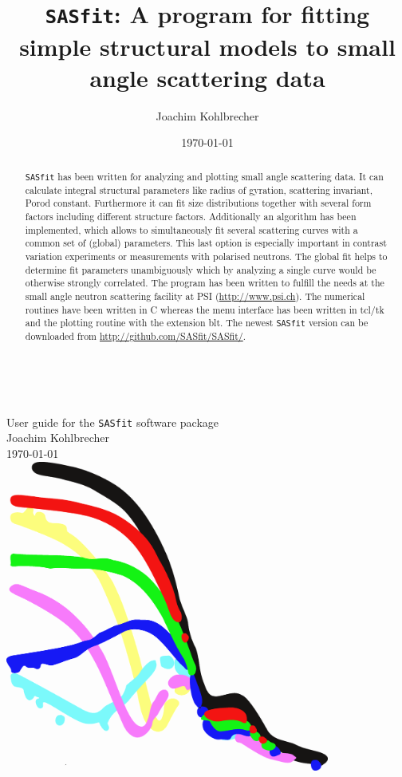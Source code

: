 \documentclass[12pt,intlimits,fleqn,reqno,twoside,english,a4paper]{amsbook}
\author[J. Kohlbrecher]{Joachim Kohlbrecher}
\numberwithin{equation}{chapter}
\numberwithin{figure}{chapter}
\numberwithin{section}{chapter}
\begin{document}
\sloppy

\setcounter{page}{0}
\thispagestyle{empty}
~\\
\begin{center}
{\Large User guide for the {\tt SASfit} software package} \\[1cm]

{\Large Joachim Kohlbrecher} ~\\[1.5cm]


\today
~\\[3.5cm]
\includegraphics[width=0.8\textwidth]{../images/SASfitIcon.png}
\end{center}


\title[SASfit]{{\tt SASfit}: A program for fitting simple
 structural models to small angle scattering data}

\date{\today}

\begin{abstract}
{\tt SASfit} has been written for analyzing and plotting small angle
scattering data. It can calculate integral structural parameters
like radius of gyration, scattering invariant, Porod constant.
Furthermore it can fit size distributions together with several form
factors including different structure factors. Additionally an
algorithm has been implemented, which allows to simultaneously fit
several scattering curves with a common set of (global) parameters.
This last option is especially important in contrast variation
experiments or measurements with polarised neutrons. The global fit
helps to determine fit parameters unambiguously which by analyzing a
single curve would be otherwise strongly correlated. The program has
been written to fulfill the needs at the small angle neutron
scattering facility at PSI (\url{http://www.psi.ch}). The
numerical routines have been written in C whereas the menu interface
has been written in tcl/tk and the plotting routine with the
extension blt. The newest {\tt SASfit} version can be downloaded
from \url{http://github.com/SASfit/SASfit/}.
\end{abstract}
\maketitle
\end{document}
